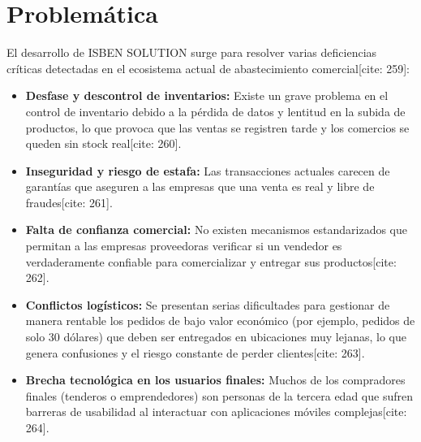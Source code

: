 \documentclass[11pt,a4paper]{report}
\begin{document}
\section{Problemática}
El desarrollo de ISBEN SOLUTION surge para resolver varias deficiencias críticas detectadas en el ecosistema actual de abastecimiento comercial[cite: 259]:
\begin{itemize}[leftmargin=*]
    \item \textbf{Desfase y descontrol de inventarios:} Existe un grave problema en el control de inventario debido a la pérdida de datos y lentitud en la subida de productos, lo que provoca que las ventas se registren tarde y los comercios se queden sin stock real[cite: 260].
    \item \textbf{Inseguridad y riesgo de estafa:} Las transacciones actuales carecen de garantías que aseguren a las empresas que una venta es real y libre de fraudes[cite: 261].
    \item \textbf{Falta de confianza comercial:} No existen mecanismos estandarizados que permitan a las empresas proveedoras verificar si un vendedor es verdaderamente confiable para comercializar y entregar sus productos[cite: 262].
    \item \textbf{Conflictos logísticos:} Se presentan serias dificultades para gestionar de manera rentable los pedidos de bajo valor económico (por ejemplo, pedidos de solo 30 dólares) que deben ser entregados en ubicaciones muy lejanas, lo que genera confusiones y el riesgo constante de perder clientes[cite: 263].
    \item \textbf{Brecha tecnológica en los usuarios finales:} Muchos de los compradores finales (tenderos o emprendedores) son personas de la tercera edad que sufren barreras de usabilidad al interactuar con aplicaciones móviles complejas[cite: 264].
\end{itemize}
\end{document}
